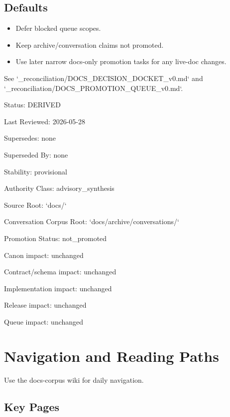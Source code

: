 \documentclass[11pt,a4paper]{report}
\begin{document}
\section{Defaults}

\begin{itemize}
\item Defer blocked queue scopes.\allowbreak{}
\item Keep archive/\allowbreak{}conversation claims not promoted.\allowbreak{}
\item Use later narrow docs-\allowbreak{}only promotion tasks for any live-\allowbreak{}doc changes.\allowbreak{}
\end{itemize}

See `\_reconciliation/\allowbreak{}DOCS\_DECISION\_DOCKET\_v0.\allowbreak{}md` and `\_reconciliation/\allowbreak{}DOCS\_PROMOTION\_QUEUE\_v0.\allowbreak{}md`.\allowbreak{}



Status: DERIVED

Last Reviewed: 2026-\allowbreak{}05-\allowbreak{}28

Supersedes: none

Superseded By: none

Stability: provisional

Authority Class: advisory\_synthesis

Source Root: `docs/\allowbreak{}`

Conversation Corpus Root: `docs/\allowbreak{}archive/\allowbreak{}conversations/\allowbreak{}`

Promotion Status: not\_promoted

Canon impact: unchanged

Contract/\allowbreak{}schema impact: unchanged

Implementation impact: unchanged

Release impact: unchanged

Queue impact: unchanged


\chapter{Navigation and Reading Paths}

Use the docs-\allowbreak{}corpus wiki for daily navigation.\allowbreak{}


\section{Key Pages}
\end{document}
